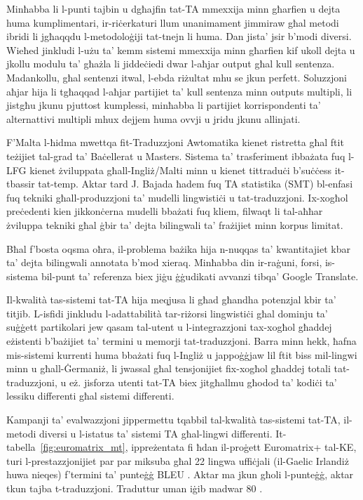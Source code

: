 \documentclass[]{../../metanetpaper}
\begin{document}
\begin{multicols}{2}
Minħabba li l-punti tajbin u dgħajfin tat-TA mmexxija minn għarfien u dejta huma kumplimentari, ir-riċerkaturi llum unanimament jimmiraw għal metodi ibridi li jgħaqqdu l-metodoloġiji tat-tnejn li huma. Dan jista’ jsir b’modi diversi. Wieħed jinkludi l-użu ta’ kemm sistemi mmexxija minn għarfien kif ukoll dejta u jkollu modulu ta’ għażla li jiddeċiedi dwar l-aħjar output għal kull sentenza. Madankollu, għal sentenzi itwal, l-ebda riżultat mhu se jkun perfett. Soluzzjoni aħjar hija li tgħaqqad l-aħjar partijiet ta’ kull sentenza minn outputs multipli, li jistgħu jkunu pjuttost kumplessi, minħabba li partijiet korrispondenti ta’ alternattivi multipli mhux dejjem huma ovvji u jridu jkunu allinjati.


F’Malta l-ħidma mwettqa fit-Traduzzjoni Awtomatika kienet ristretta għal ftit teżijiet tal-grad ta’ Baċellerat u Masters. Sistema ta’ trasferiment ibbażata fuq l-LFG kienet żviluppata għall-Ingliż/Malti minn \cite{Farrugia:2000} u kienet tittraduċi b’suċċess it-tbassir tat-temp. Aktar tard J. Bajada \cite{Bajada:2004, Bajada:2009} ħadem fuq TA statistika (SMT) bl-enfasi fuq tekniki għall-produzzjoni ta’ mudelli lingwistiċi u tat-traduzzjoni. Ix-xogħol preċedenti kien jikkonċerna mudelli bbażati fuq kliem, filwaqt li tal-aħħar żviluppa tekniki għal ġbir ta’ dejta bilingwali ta’ frażijiet minn korpus limitat.

Bħal f'bosta oqsma oħra, il-problema bażika hija n-nuqqas ta’ kwantitajiet kbar ta’ dejta bilingwali annotata b’mod xieraq. Minħabba din ir-raġuni, forsi, is-sistema bil-punt ta’ referenza biex jiġu ġġudikati avvanzi tibqa’ Google Translate.

Il-kwalità tas-sistemi tat-TA hija meqjusa li għad għandha potenzjal kbir ta’ titjib. L-isfidi jinkludu l-adattabilità tar-riżorsi lingwistiċi għal dominju ta’ suġġett partikolari jew qasam tal-utent u l-integrazzjoni tax-xogħol għaddej eżistenti b’bażijiet ta’ termini u memorji tat-traduzzjoni. Barra minn hekk, ħafna mis-sistemi kurrenti huma bbażati fuq l-Ingliż u jappoġġjaw lil ftit biss mil-lingwi minn u għall-Ġermaniż, li jwassal għal tensjonijiet fix-xogħol għaddej totali tat-traduzzjoni, u eż. jisforza utenti tat-TA biex jitgħallmu għodod ta’ kodiċi ta’ lessiku differenti għal sistemi differenti.

Kampanji ta’ evalwazzjoni jippermettu tqabbil tal-kwalità tas-sistemi tat-TA, il-metodi diversi u l-istatus ta’ sistemi TA għal-lingwi differenti. It-tabella~\ref{fig:euromatrix_mt}, ippreżentata fi ħdan il-proġett Euromatrix+ tal-KE, turi l-prestazzjonijiet par par miksuba għal 22 lingwa uffiċjali (il-Gaelic Irlandiż huwa nieqes) f'termini ta’ punteġġ BLEU \cite{bleu1}. Aktar ma jkun għoli l-punteġġ, aktar tkun tajba t-traduzzjoni. Traduttur uman iġib madwar 80 \cite{bleu1}.


\end{multicols}
\end{document}
